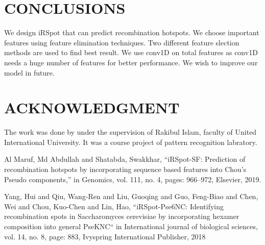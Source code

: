 \documentclass[letterpaper, 10 pt, conference]{ieeeconf}  %
\begin{document}
\section{CONCLUSIONS}
We design iRSpot that can predict recombination hotspots. We choose important features using feature elimination techniques. Two different feature slection methods are used to find best result. We use conv1D on total features as conv1D needs a huge number of features for better performance. We wish to improve our model in future. 


\section*{ACKNOWLEDGMENT}
The work was done by under the supervision of Rakibul Islam, faculty of United International University. It was a course project of pattern recognition labratory.




\begin{thebibliography}{1}
 Al Maruf, Md Abdullah and Shatabda, Swakkhar, ``iRSpot-SF: Prediction of recombination hotspots by incorporating sequence based features into Chou's Pseudo components,'' 	in Genomics, vol. 111, no. 4, pages: 966--972, Elsevier, 2019. 

 Yang, Hui and Qiu, Wang-Ren and Liu, Guoqing and Guo, Feng-Biao and Chen, Wei and Chou, Kuo-Chen and Lin, Hao, ``iRSpot-Pse6NC: Identifying recombination spots in Saccharomyces cerevisiae by incorporating hexamer composition into general PseKNC``  in International journal of biological sciences, vol. 14, no. 8, page: 883, Ivyspring International Publisher, 2018

\end{thebibliography}
\end{document}
